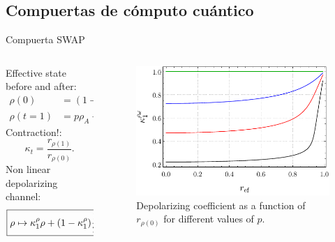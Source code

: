 \subsection{Compuertas de cómputo cuántico}
\begin{frame}{Compuerta SWAP}
    \begin{columns}
        \begin{column}{0.5\textwidth}
            Effective state before and after:
            \begin{align*}
                \rho(0)&=(1-p)\rho_{A}+p\rho_{B},\\
                \rho(t=1)&=p\rho_{A}+(1-p)\rho_{B}.
                \end{align*}
                Contraction!:
                \begin{equation*}
                    \kappa_{t}=\frac{r_{\rho(1)}}{r_{\rho(0)}}.
                  \end{equation*}
                  Non linear depolarizing channel:
                  \begin{equation*}
                      \boxed{\rho\mapsto\kappa_{1}^{\rho}\rho+(1-\kappa_{1}^{\rho})\frac{1}{2}\Id}
                    \end{equation*}
        \end{column}
        \begin{column}{0.5\textwidth}
            \begin{figure}[h!]
                \centering
                \includegraphics[width=0.9\linewidth]{figures/maxent_results/K(r).pdf}
                \caption{Depolarizing coefficient as a function of $r_{\rho(0)}$ for different values of $p$.}
                \label{fig:SWAPFactor2D}
              \end{figure}
        \end{column}
    \end{columns}
\end{frame}
